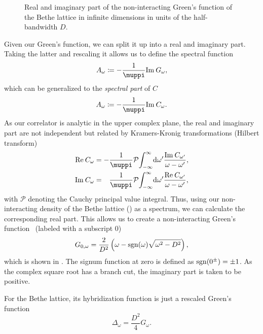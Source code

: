 \begin{figure}[ht]
    \centering
    
    \caption{
        Real and imaginary part of the non-interacting Green's function of the
        Bethe lattice in infinite dimensions in units of the half-bandwidth $D$.
    }%
    \label{fig:bethe-greens-function}
\end{figure}
Given our Green's function,
we can split it up into a real and imaginary part.
Taking the latter and rescaling it allows us to define the spectral function
\begin{equation}
    A_\omega \coloneq -\frac{1}{\muppi}\Im G_\omega,
\end{equation}
which can be generalized to the \emph{spectral part} of $C$
\begin{equation}
    A_\omega \coloneq -\frac{1}{\muppi}\Im C_\omega.
    \label{eq:spectral-part}
\end{equation}
As our correlator is analytic in the upper complex plane,
the real and imaginary part are not independent
but related by Kramers-Kronig transformations (Hilbert transform)~\cite{Economou2006}
\begin{subequations}
    \begin{align}
        \Re C_\omega
         & =
        - \frac{1}{\muppi} \mathcal{P}\! \int_{-\infty}^\infty\! \md\omega'
        \frac{\Im C_{\omega'}}{\omega - \omega'},
        \label{eq:kramers-kronig-real} \\
        \Im C_\omega
         & =
        \phantom{-} \frac{1}{\muppi} \mathcal{P}\! \int_{-\infty}^\infty\! \md\omega'
        \frac{\Re C_{\omega'}}{\omega - \omega'},
    \end{align}%
\end{subequations}
with $\mathcal{P}$ denoting the Cauchy principal value integral.
Thus, using our non-interacting density of the Bethe lattice ()
as a spectrum,
we can calculate the corresponding real part.
This allows us to create a non-interacting Green's function~\cite{Economou2006}
(labeled with a subscript $0$)
\begin{equation}
    G_{0,\omega}
    =
    \frac{2}{D^2} \left(\omega - \operatorname{sgn}(\omega) \sqrt{\omega^2 - D^2}\right),
\end{equation}
which is shown in .
The signum function at zero is defined as $\operatorname{sgn}(0^\pm) = \pm 1$.
As the complex square root has a branch cut,
the imaginary part is taken to be positive.

For the Bethe lattice,
its hybridization function is just a rescaled Green's function~\cite{Georges1996}
\begin{equation}
    \Delta_\omega = \frac{D^2}{4} G_\omega.
\end{equation}

